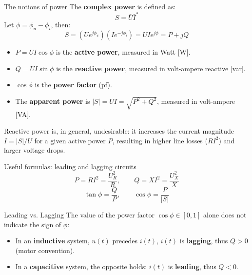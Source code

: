 \begin{frame}[allowframebreaks]{The notions of power}
  The \textbf{complex power} is defined as:
  $$S = \bar{U}\bar{I}^*$$
  Let $\phi = \phi_u - \phi_i$, then:
  $$S = (U e^{j\phi_u})(I e^{-j\phi_i}) = UI e^{j\phi} = P + jQ$$
  \begin{itemize}
    \item $P = UI \cos\phi$ is the \textbf{active power}, measured in Watt [W].
    \item $Q = UI \sin\phi$ is the \textbf{reactive power}, measured in volt-ampere reactive [var].
    \item $\cos\phi$ is the \textbf{power factor} (pf).
    \item The \textbf{apparent power} is $|S| = UI = \sqrt{P^2 + Q^2}$, measured in volt-ampere [VA].
  \end{itemize}
  \vspace{0.2cm}
  \alert{Reactive power is, in general, undesirable}: it increases the current magnitude $I = |S|/U$ for a given active power $P$, resulting in higher line losses ($R I^2$) and larger voltage drops.
\end{frame}

\begin{frame}{Useful formulas: leading and lagging circuits}
  $$P = R I^2 = \frac{U_R^2}{R}, \qquad Q = X I^2 = \frac{U_X^2}{X}$$
  $$\tan \phi = \frac{Q}{P}, \qquad \cos \phi = \frac{P}{|S|}$$
  \begin{block}{Leading vs. Lagging}
    The value of the power factor $\cos\phi \in [0, 1]$ alone does not indicate the sign of $\phi$:
    \begin{itemize}
      \item In an \textbf{inductive} system, $u(t)$ precedes $i(t)$, $i(t)$ is \textbf{lagging}, thus $Q > 0$ (motor convention).
      \item In a \textbf{capacitive} system, the opposite holds: $i(t)$ is \textbf{leading}, thus $Q < 0$.
    \end{itemize}
  \end{block}
\end{frame}

